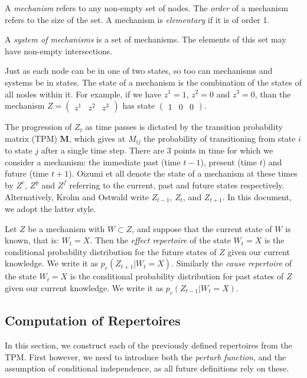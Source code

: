 \begin{definition}{A \textit{mechanism} refers to any non-empty set of nodes. The \textit{order} of a mechanism refers to the size of the set. A mechanism is \textit{elementary} if it is of order 1.}
\end{definition}

\begin{definition}{A \textit{system of mechanisms} is a set of mechanisms. The elements of this set may have non-empty intersections.}
\end{definition}


Just as each node can be in one of two states, so too can mechanisms and systems be in states. The state of a mechanism is the combination of the states of all nodes within it. For example, if we have $z^1=1$, $z^2=0$ and $z^3=0$, than the mechanism $Z = \left(\begin{array}{ccc}z^1&z^2&z^3\end{array}\right)$ has state $\left(\begin{array}{ccc}1&0&0\end{array}\right)$. 


The progression of $Z_t$ as time passes is dictated by the transition probability matrix (TPM) $\mathbf{M}$, which gives at $M_{ij}$ the probability of transitioning from state $i$ to state $j$ after a single time step. There are 3 points in time for which we consider a mechanism: the immediate past (time $t-1$), present (time $t$) and future (time $t+1$). Oizumi et all \cite{main} denote the state of a mechanism at these times by $Z^c$, $Z^p$ and $Z^f$ referring to the current, past and future states respectively. Alternatively, Krohn and Ostwald \cite{krohn2016computing} write $Z_{t-1}$, $Z_{t}$, and $Z_{t+1}$. In this document, we adopt the latter style.


\begin{definition}
	{Let $Z$ be a mechanism with $W\subset Z$, and suppose that the current state of $W$ is known, that is: $W_t = X$. Then the \textit{effect repertoire} of the state $W_t = X$ is the conditional probability distribution for the future states of $Z$ given our current knowledge. We write it as $p_e(Z_{t+1}|W_t=X)$. Similarly the \textit{cause repertoire} of the state $W_t = X$ is the conditional probability distribution for past states of $Z$ given our current knowledge. We write it as $p_c(Z_{t-1}|W_t = X)$.}
\end{definition}


\subsection{Computation of Repertoires}
In this section, we construct each of the previously defined repertoires from the TPM. First however, we need to introduce both the \textit{perturb function}, and the assumption of conditional independence, as all future definitions rely on these.

